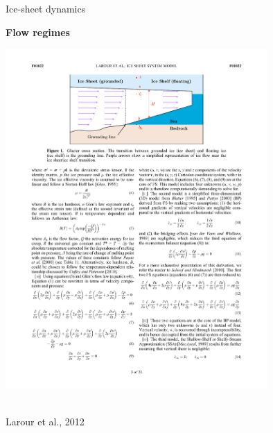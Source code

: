 \documentclass[aspectratio=169,xcolor=dvipsnames]{beamer}
\newcommand\credit[2]{
        \\ \vspace{-0.5em}
        {\color{gray}\scriptsize
        \hfill
        #1
        \hspace{#2}}
        }
\begin{document}
\begin{frame}[t]{Ice-sheet dynamics}

\vspace{-1.0em}

\begin{center}
\textbf{{\large
Flow regimes
}}
\end{center}

\footnotesize 
\centering

\vspace{-0.5em}

\includegraphics[width=0.75\textwidth]{figs/Fig-ice-flow-regimes-larour2012.pdf}
\credit{Larour et al., 2012}{50pt}

\end{frame}
\end{document}
